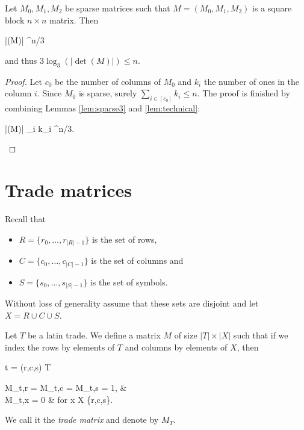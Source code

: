 \begin{lem}
Let $M_0,M_1,M_2$ be sparse matrices such that $M = (M_0,M_1,M_2)$ is a  square block $n \times n$ matrix. Then
\begin{cosyeqnarray}
 	|\det(M)| ^{n/3}
\end{cosyeqnarray}%
and thus $3 \log_3(|\det(M)|) \leq n$.
\end{lem}
\begin{proof}
Let $c_0$ be the number of columns of $M_0$ and $k_i$ the number of ones in the column $i$. Since $M_0$ is sparse, surely $\sum_{i \in [c_0]} k_i \leq n$. The proof is finished by combining Lemmas \ref{lem:sparse3} and \ref{lem:technical}:
\begin{cosyeqnarray}
	|\det(M)| \leq \prod_{i \in [c_0]} k_i ^{n/3}.
\end{cosyeqnarray}%
\end{proof}

\section{Trade matrices}
Recall that
\begin{itemize}
	\item $R = \{r_0,\dots,r_{|R|-1}\}$ is the set of rows,
	\item $C = \{c_0,\dots,c_{|C|-1}\}$ is the set of columns and
	\item $S = \{s_0,\dots,s_{|S|-1}\}$ is the set of symbols.
\end{itemize}
Without loss of generality assume that these sets are disjoint and let $X = R \cup C \cup S$.

\begin{defn}
Let $T$ be a latin trade. We define a matrix $M$ of size $|T| \times |X|$ such that if we index the rows by elements of $T$ and columns by elements of $X$, then
\begin{cosyeqnarray}
	t = (r,c,s) \in T \Rightarrow
	\begin{cases}
		M_{t,r} = M_{t,c} = M_{t,s} = 1, & \\
		M_{t,x} = 0 & \textrm{ for } x \in X \setminus \{r,c,s\}.
	\end{cases}
\end{cosyeqnarray}%
\end{defn}
We call it the \emph{trade matrix} and denote by $M_T$.

